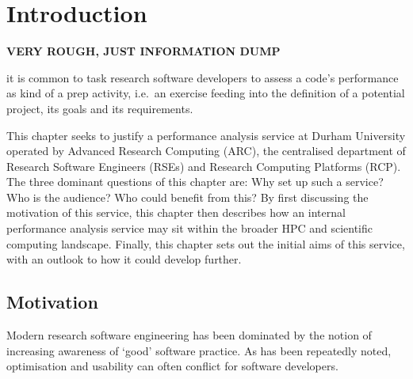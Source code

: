 \chapter{Introduction}
\label{chapter:intro}

\textbf{VERY ROUGH, JUST INFORMATION DUMP}


 it is common to task
research software developers to assess a code's performance as kind of a prep activity, i.e.~an exercise feeding into the definition of a potential project, its goals and its requirements.


This chapter seeks to justify a performance analysis service at Durham University operated by Advanced Research Computing (ARC), the centralised department of Research Software Engineers (RSEs) and Research Computing Platforms (RCP). The three dominant questions of this chapter are: Why set up such a service? Who is the audience? Who could benefit from this? By first discussing the motivation of this service, this chapter then describes how an internal performance analysis service may sit within the broader HPC and scientific computing landscape. Finally, this chapter sets out the initial aims of this service, with an outlook to how it could develop further.

\section{Motivation}
Modern research software engineering has been dominated by the notion of increasing awareness of `good' software practice. As has been repeatedly noted, optimisation and usability can often conflict for software developers.

